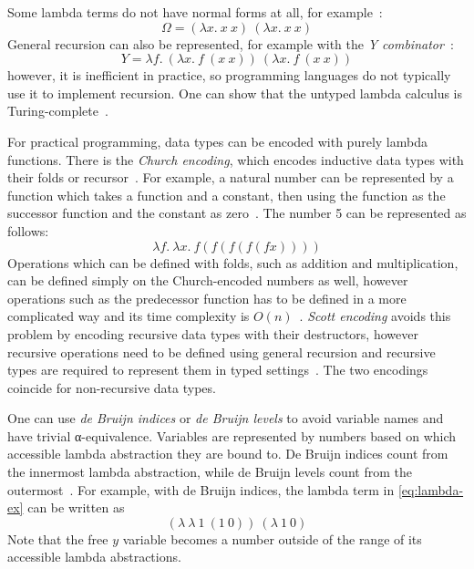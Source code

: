 Some lambda terms do not have normal forms at all, for
example~\cite{functional-Hudak, lambda-Hindley, type-Pierce}:
\begin{equation}
  \Omega = (\lambda x.\ x\ x)\ (\lambda x.\ x\ x)
  \label{eq:omega}
\end{equation}
General recursion can also be represented, for example with the \emph{Y
  combinator}~\cite{functional-Hudak, lambda-Revesz, lambda-Hindley}:
\begin{equation}
  Y = \lambda f.\ (\lambda x.\ f\ (x\ x))\ (\lambda x.\ f\ (x\ x))
  \label{eq:ycomb}
\end{equation}
however, it is inefficient in practice, so programming languages do not
typically use it to implement recursion. One can show that the untyped lambda
calculus is Turing-complete~\cite{lambda-Turing, type-Pierce}.

For practical programming, data types can be encoded with purely lambda
functions. There is the \emph{Church encoding}, which encodes inductive data
types with their folds or recursor~\cite{church-Koopman, scott-Jansen}. For
example, a natural number can be represented by a function which takes a
function and a constant, then using the function as the successor function and
the constant as zero~\cite{lambda-Revesz, lambda-Church, type-Pierce}. The
number 5 can be represented as follows:
\begin{equation}
  \lambda f.\ \lambda x.\ f (f (f (f (f x))))
  \label{eq:lambda-church-ex}
\end{equation}
Operations which can be defined with folds, such as addition and multiplication,
can be defined simply on the Church-encoded numbers as well, however operations
such as the predecessor function has to be defined in a more complicated way and
its time complexity is \(O(n)\)~\cite{lambda-Revesz, type-Pierce}. \emph{Scott
  encoding} avoids this problem by encoding recursive data types with their
destructors, however recursive operations need to be defined using general
recursion and recursive types are required to represent them in typed
settings~\cite{combinator-Curry, church-Koopman, scott-Jansen}. The two
encodings coincide for non-recursive data types.

One can use \emph{de Bruijn indices} or \emph{de Bruijn levels} to avoid
variable names and have trivial α-equivalence. Variables are represented by
numbers based on which accessible lambda abstraction they are bound to. De
Bruijn indices count from the innermost lambda abstraction, while de Bruijn
levels count from the outermost~\cite{debruijn}. For example, with de Bruijn
indices, the lambda term in \cref{eq:lambda-ex} can be written as
\begin{equation}
  (\lambda\ \lambda\ 1\ (1\ 0))\ (\lambda\ 1\ 0)
  \label{eq:lambda-ex-index}
\end{equation}
Note that the free \(y\) variable becomes a number outside of the range of its
accessible lambda abstractions.

